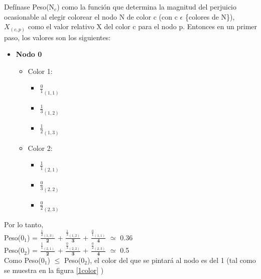 Defínase Peso(N$_{c}$) como la función que determina la magnitud del perjuicio ocasionable al elegir colorear el nodo N de color c (con c $\epsilon$ \{colores de N\}), ${X}_{(c,p)}$ como el valor relativo X del color c para el nodo p. Entonces en un primer paso, los valores son los siguientes: 

\begin{itemize}
	\item \textbf{Nodo 0}
	\begin{itemize}
		\item Color 1:
		\begin{itemize}
			\item  $\frac{0}{1}_{(1,1)}$
			\item  $\frac{1}{3}_{(1,2)}$
			\item  $\frac{1}{2}_{(1,3)}$
		\end{itemize}

		\item Color 2:
		\begin{itemize}
			\item  $\frac{1}{1}_{(2,1)}$
			\item  $\frac{0}{3}_{(2,2)}$
			\item  $\frac{0}{2}_{(2,3)}$
		\end{itemize}
	\end{itemize}
\end{itemize}

Por lo tanto, \\
Peso(0$_{1}$) =  $\frac{ \frac{1}{2}_{(1,3)}}{\textbf{2}}$ + $\frac{\frac{1}{3}_{(1,2)}}{\textbf{3}}$ + $\frac{\frac{0}{1}_{(1,1)}}{\textbf{4}}$ $\simeq$ 0.36 \\
Peso(0$_{2}$) =  $\frac{\frac{1}{1}_{(2,1)}}{\textbf{2}}$ + $\frac{\frac{0}{3}_{(2,2)}}{\textbf{3}}$ + $\frac{\frac{0}{2}_{(2,3)}}{\textbf{4}}$ $\simeq$  0.5 \\
\newline
Como Peso(0$_{1}$) $\leq$  Peso(0$_{2}$), el color del que se pintará al nodo es del 1 (tal como se muestra en la \newline 
figura \ref{1color} )

